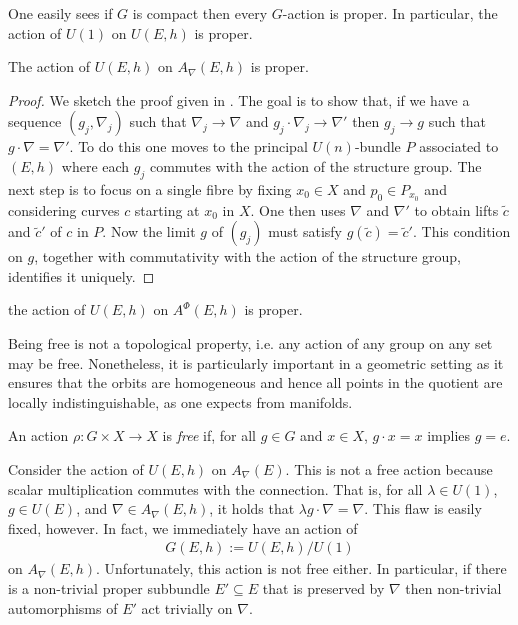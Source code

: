 \documentclass[12pt]{ociamthesis}  %
\begin{document}
\begin{example}
  One easily sees if $G$ is compact then every $G$-action is proper.
  In particular, the action of $U(1)$ on $U(E,h)$ is
  proper.
\end{example}

\begin{example}\label{ex:h_proper_action}
  The action of $U(E,h)$ on $A_\nabla(E,h)$ is proper.
  \begin{proof}
    We sketch the proof given in
    \cite[{Proposition 7.1.14}]{kobayashi1987}.
    The goal is to show that, if we have a sequence $(g_j,\nabla_j)$
    such that $\nabla_j\to\nabla$ and $g_j\cdot\nabla_j\to\nabla'$
    then $g_j\to g$ such that $g\cdot\nabla = \nabla'$. To do this
    one moves to the principal $U(n)$-bundle $P$ associated to $(E,h)$
    where each $g_j$ commutes with the action of the structure
    group. The next step is to focus on a single fibre by fixing $x_0\in X$ and
    $p_0\in P_{x_0}$ and considering curves $c$ starting at $x_0$ in $X$.
    One then uses $\nabla$ and $\nabla'$ to obtain lifts $\tilde c$ and
    $\tilde c'$ of $c$ in $P$. Now the limit $g$ of $(g_j)$ must satisfy
    $g(\tilde c) = \tilde c'$. This condition on $g$, together with
    commutativity with the action of the structure group, identifies it
    uniquely.
  \end{proof}
\end{example}

\begin{example}\label{ex:higgs_proper_action}
  the action of $U(E,h)$ on $A^\Phi (E,h)$ is proper.
  \missingexample
\end{example}

Being free is not a topological property, i.e. any action of any group on any
set may be free. Nonetheless, it is particularly important in a geometric
setting as it ensures that the orbits are homogeneous and hence all points in
the quotient are locally indistinguishable, as one expects from manifolds.

\begin{definition}
  An action $\rho : G\times X\to X$ is \emph{free} if, for all
  $g\in G$ and $x\in X$, $g\cdot x = x$ implies $g = e$.
\end{definition}

\begin{example}\label{ex:not_free}
  Consider the action of $U(E,h)$ on $A_\nabla(E)$. This is not a free action
  because scalar multiplication commutes with the connection. That is,
  for all $\lambda\in U(1)$, $g\in U(E)$, and $\nabla\in A_\nabla(E,h)$,
  it holds that $\lambda g\cdot \nabla = \nabla$. This flaw is easily fixed,
  however. In fact, we immediately have an action of
  \begin{align*}
    G(E,h) := U(E,h) / U(1)
  \end{align*}
  on $A_\nabla(E,h)$. Unfortunately, this action is not free either. In particular,
  if there is a non-trivial proper subbundle $E'\subseteq E$ that is preserved
  by $\nabla$ then non-trivial automorphisms of $E'$ act trivially on $\nabla$.
\end{example}
\end{document}
